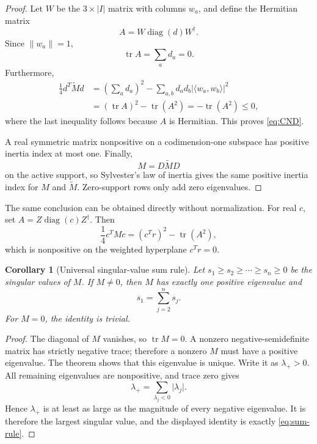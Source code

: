 \documentclass[11pt]{article}
\newcommand{\tr}{\operatorname{tr}}
\newcommand{\diag}{\operatorname{diag}}
\newcommand{\norm}[1]{\lVert #1\rVert}
\newcommand{\abs}[1]{\lvert #1\rvert}
\newcommand{\ip}[2]{\langle #1,#2\rangle}
\newtheorem{corollary}[theorem]{Corollary}
\theoremstyle{remark}
\begin{document}
\begin{proof}
Let $W$ be the $3\times\abs I$ matrix with columns $w_a$, and define the Hermitian matrix
\[
 A=W\diag(d)W^\dagger.
\]
Since $\norm{w_a}=1$,
\[
 \tr A=\sum_a d_a=0.
\]
Furthermore,
\begin{align}
 \frac14 d^T\widetilde M d
 &=\left(\sum_a d_a\right)^2
   -\sum_{a,b}d_a d_b\abs{\ip{w_a}{w_b}}^2 \\
 &=(\tr A)^2-\tr(A^2)
 =-\tr(A^2)\le0,
\end{align}
where the last inequality follows because $A$ is Hermitian.  This proves \eqref{eq:CND}.

A real symmetric matrix nonpositive on a codimension-one subspace has positive inertia index at most one.  Finally,
\[
 M=D\widetilde M D
\]
on the active support, so Sylvester's law of inertia gives the same positive inertia index for $M$ and $\widetilde M$.  Zero-support rows only add zero eigenvalues.
\end{proof}

The same conclusion can be obtained directly without normalization.  For real $c$, set $A=Z\diag(c)Z^\dagger$.  Then
\begin{equation}
 \frac14 c^TMc=(c^Tr)^2-\tr(A^2),
 \label{eq:weighted-form}
\end{equation}
which is nonpositive on the weighted hyperplane $c^Tr=0$.

\begin{corollary}[Universal singular-value sum rule]
Let $s_1\ge s_2\ge\cdots\ge s_n\ge0$ be the singular values of $M$.  If $M\ne0$, then $M$ has exactly one positive eigenvalue and
\begin{equation}
 \boxed{s_1=\sum_{j=2}^n s_j.}
 \label{eq:sum-rule}
\end{equation}
For $M=0$, the identity is trivial.
\end{corollary}

\begin{proof}
The diagonal of $M$ vanishes, so $\tr M=0$.  A nonzero negative-semidefinite matrix has strictly negative trace; therefore a nonzero $M$ must have a positive eigenvalue.  The theorem shows that this eigenvalue is unique.  Write it as $\lambda_+>0$.  All remaining eigenvalues are nonpositive, and trace zero gives
\[
 \lambda_+=\sum_{\lambda_j<0}\abs{\lambda_j}.
\]
Hence $\lambda_+$ is at least as large as the magnitude of every negative eigenvalue.  It is therefore the largest singular value, and the displayed identity is exactly \eqref{eq:sum-rule}.
\end{proof}
\end{document}
